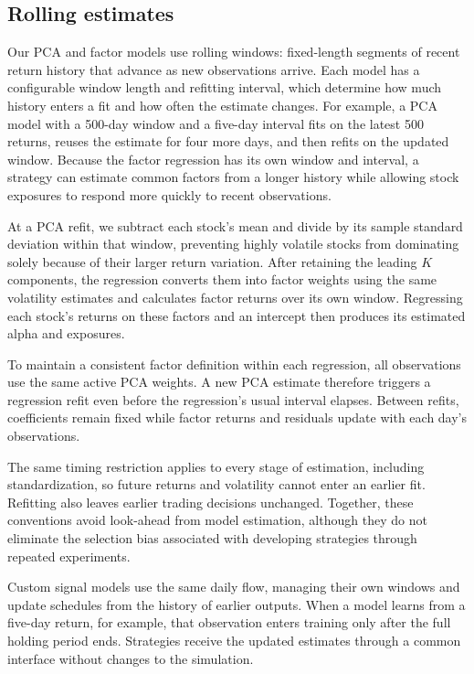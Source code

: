 \documentclass[11pt,letterpaper]{article}
\begin{document}
\subsection{Rolling estimates}

Our PCA and factor models use rolling windows: fixed-length segments of
recent return history that advance as new observations arrive. Each model
has a configurable window length and refitting interval, which determine
how much history enters a fit and how often the estimate changes.
For example, a PCA model with a 500-day window and a five-day interval
fits on the latest 500 returns, reuses the estimate for four more days,
and then refits on the updated window. Because the factor regression has
its own window and interval, a strategy can estimate common factors from
a longer history while allowing stock exposures to respond more quickly
to recent observations.

At a PCA refit, we subtract each stock's mean and divide by its sample
standard deviation within that window, preventing highly volatile stocks
from dominating solely because of their larger return variation. After
retaining the leading \(K\) components, the regression converts them into
factor weights using the same volatility estimates and calculates factor
returns over its own window. Regressing each stock's returns on these
factors and an intercept then produces its estimated alpha and exposures.

To maintain a consistent factor definition within each regression, all
observations use the same active PCA weights. A new PCA estimate therefore
triggers a regression refit even before the regression's usual interval
elapses. Between refits, coefficients remain fixed while factor returns
and residuals update with each day's observations.

The same timing restriction applies to every stage of estimation,
including standardization, so future returns and volatility cannot enter
an earlier fit. Refitting also leaves earlier trading decisions unchanged.
Together, these conventions avoid look-ahead from model estimation,
although they do not eliminate the selection bias associated with
developing strategies through repeated experiments.

Custom signal models use the same daily flow, managing their own windows
and update schedules from the history of earlier outputs. When a model
learns from a five-day return, for example, that observation enters training
only after the full holding period ends. Strategies receive the updated
estimates through a common interface without changes to the simulation.
\end{document}
